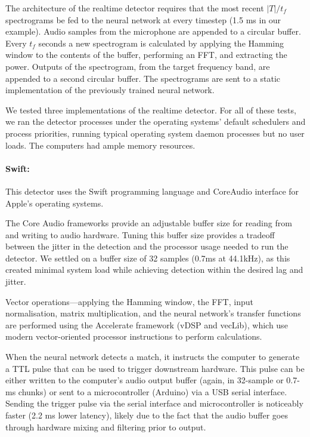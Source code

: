 \documentclass[10pt,letterpaper]{article}
\begin{document}
The architecture of the realtime detector requires that the most
recent $|T|/t_f$ spectrograms be fed to the neural network at every
timestep (1.5 ms in our example).  Audio samples from the microphone
are appended to a circular buffer.  Every $t_f$ seconds a new
spectrogram is calculated by applying the Hamming window to the
contents of the buffer, performing an FFT, and extracting the
power. Outputs of the spectrogram, from the target frequency band, are
appended to a second circular buffer.  The spectrograms are sent to a
static implementation of the previously trained neural network.

We tested three implementations of the realtime detector.  For all of
these tests, we ran the detector processes under the operating
systems' default schedulers and process priorities, running typical
operating system daemon processes but no user loads.  The computers
had ample memory resources.

\paragraph{Swift:}

This detector uses the Swift programming language and CoreAudio
interface for Apple's operating systems.

The Core Audio frameworks provide an adjustable buffer size for 
reading from and writing to audio hardware. Tuning this buffer size
provides a tradeoff between the jitter in the detection and the 
processor usage needed to run the detector. We settled on a buffer 
size of 32 samples (0.7ms at 44.1kHz), as this created minimal system
load while achieving detection within the desired lag and jitter.

Vector operations---applying the Hamming window, the FFT, input
normalisation, matrix multiplication, and the neural network's
transfer functions are performed using the Accelerate framework (vDSP
and vecLib), which use modern vector-oriented processor instructions
to perform calculations.

When the neural network detects a match, it instructs the computer to
generate a TTL pulse that can be used to trigger downstream hardware.
This pulse can be either written to the computer's audio output buffer (again, in
32-sample or 0.7-ms chunks) or sent to a microcontroller (Arduino) via
a USB serial interface. Sending the trigger pulse via the serial
interface and microcontroller is noticeably faster (2.2 ms lower
latency), likely due to the fact that the audio buffer goes through
hardware mixing and filtering prior to output.
\end{document}

